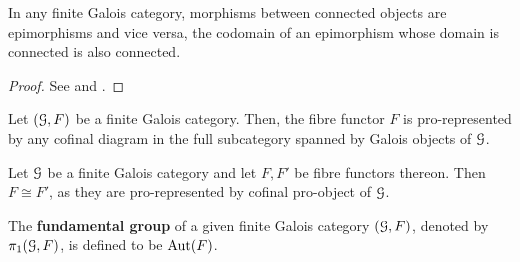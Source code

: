             \begin{lemma} \label{lemma: morphisms_between_connected_objects_are_epic}
                In any finite Galois category, morphisms between connected objects are epimorphisms and vice versa, the codomain of an epimorphism whose domain is connected is also connected.
            \end{lemma}
                \begin{proof}
                    See \cite[\href{https://stacks.math.columbia.edu/tag/0BN0}{Tag 0BN0}]{stacks} and \cite[Proposition 3.5]{nlab:connected_objects}.
                \end{proof}
            \begin{proposition} \label{prop: fibre_functors_of_finite_galois_categories_are_pro_represented_by_galois_objects}
                \cite[\href{https://stacks.math.columbia.edu/tag/0BN3}{Tag 0BN3}]{stacks} Let $(\mathcal{G}, F)$ be a finite Galois category. Then, the fibre functor $F$ is pro-represented by any cofinal diagram in the full subcategory spanned by Galois objects of $\mathcal{G}$.
            \end{proposition}
            \begin{corollary} \label{coro: only_one_fibre_functor_on_a_finite_galois_category}
                Let $\mathcal{G}$ be a finite Galois category and let $F, F'$ be fibre functors thereon. Then $F \cong F'$, as they are pro-represented by cofinal pro-object of $\mathcal{G}$.
            \end{corollary}
            
            \begin{definition} \label{def: fundamental_groups_of_finite_galois_categories}
                The \textbf{fundamental group} of a given finite Galois category $(\mathcal{G}, F)$, denoted by $\pi_1(\mathcal{G}, F)$, is defined to be $\mathrm{Aut}(F)$.
            \end{definition}
            
